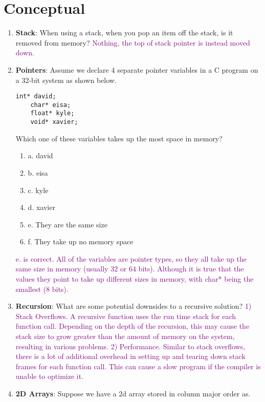 \documentclass{article}
\begin{document}
\section{Conceptual}
\begin{enumerate}[label=(\alph*)]
    \item \textbf{Stack}: When using a stack, when you pop an item off the stack, is it removed from memory?
    \newline
    \textcolor{purple} {Nothing, the top of stack pointer is instead moved down.}
    \item \textbf{Pointers}: Assume we declare 4 separate pointer variables in a C program on a 32-bit system as shown below.
    \begin{lstlisting}[style=CStyle]
    int* david;
    char* eisa;
    float* kyle;
    void* xavier;
    \end{lstlisting}
    Which one of these variables takes up the most space in memory?
    \begin{enumerate}[label={}]
    \item a. david
    \item b. eisa
    \item c. kyle
    \item d. xavier
    \item e. They are the same size
    \item f. They take up no memory space
    \end{enumerate}
    \textcolor{purple}{ e. is correct. All of the variables are pointer types, so they all take up the same size in memory (usually 32 or 64 bits). Although it is true that the values they point to take up different sizes in memory, with char* being the smallest (8 bits). 
    }
    \item \textbf{Recursion}: What are some potential downsides to a recursive solution?
    \textcolor{purple}{ 1) Stack Overflows. A recursive function uses the run time stack for each function call. Depending on the depth of the recursion, this may cause the stack size to grow greater than the amount of memory on the system, resulting in various problems.
    2) Performance. Similar to stack overflows, there is a lot of additional overhead in setting up and tearing down stack frames for each function call. This can cause a slow program if the compiler is unable to optimize it.}
    \item \textbf{2D Arrays}: Suppose we have a 2d array stored in column major order as. 
    \begin{center}

\end{center}
\end{enumerate}
\end{document}
